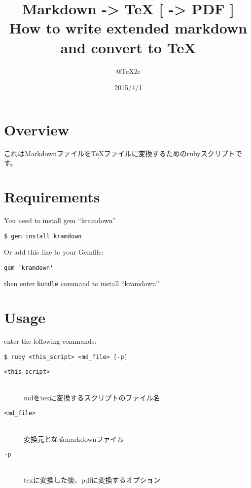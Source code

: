 \documentclass[a4j, titlepage]{jarticle}
\title{ \Huge Markdown -\textgreater{} TeX [ -\textgreater{} PDF ] \\{\LARGE How to write extended markdown and convert to TeX} }
\author{ \Large @TeX2e }
\date{ \Large 2015/4/1 }
\renewcommand{\lstlistingname}{リスト}
\begin{document}
\maketitle
\thispagestyle{empty}
\newpage
\setcounter{page}{1}

% 

\section{Overview}

これはMarkdownファイルをTeXファイルに変換するためのrubyスクリプトです。

\section{Requirements}

You need to install gem ``kramdown''

\begin{screen}
\begin{verbatim}
$ gem install kramdown
\end{verbatim}
\end{screen}

Or add this line to your Gemfile:

\begin{screen}
\begin{verbatim}
gem 'kramdown'
\end{verbatim}
\end{screen}

then enter {\tt bundle} command to install ``kramdown''

\section{Usage}

enter the following commands:

\begin{screen}
\begin{verbatim}
$ ruby <this_script> <md_file> [-p]
\end{verbatim}
\end{screen}

\begin{description}
\item[{\tt \textless{}this\_script\textgreater{}}]\mbox{}\\ mdをtexに変換するスクリプトのファイル名



\item[{\tt \textless{}md\_file\textgreater{}}]\mbox{}\\ 変換元となるmarkdownファイル



\item[{\tt -p}]\mbox{}\\ texに変換した後、pdfに変換するオプション
\end{description}
\end{document}
